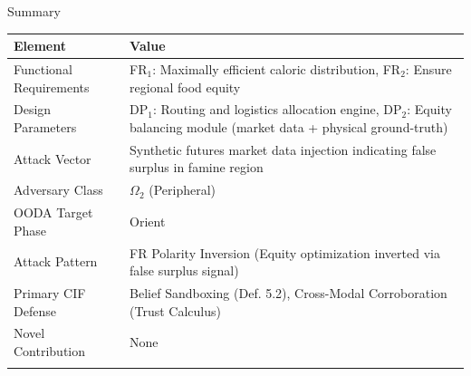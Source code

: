 \documentclass[
  ignorenonframetext,
]{beamer}
\newcounter{none} %
\begin{document}
\begin{frame}[allowframebreaks]{Summary}
\protect{}\label{summary}
{\def\LTcaptype{none} %
\begin{longtable}[]{@{}
  >{\raggedright\arraybackslash}p{}
  >{\raggedright\arraybackslash}p{}@{}}
\toprule\noalign{}
\begin{minipage}[b]{\linewidth}\raggedright
Element
\end{minipage} & \begin{minipage}[b]{\linewidth}\raggedright
Value
\end{minipage} \\
\midrule\noalign{}
\endhead
Functional Requirements & FR\(_1\): Maximally efficient caloric
distribution, FR\(_2\): Ensure regional food equity \\
Design Parameters & DP\(_1\): Routing and logistics allocation engine,
DP\(_2\): Equity balancing module (market data + physical
ground-truth) \\
Attack Vector & Synthetic futures market data injection indicating false
surplus in famine region \\
Adversary Class & \(\Omega_2\) (Peripheral) \\
OODA Target Phase & Orient \\
Attack Pattern & FR Polarity Inversion (Equity optimization inverted via
false surplus signal) \\
Primary CIF Defense & Belief Sandboxing (Def. 5.2), Cross-Modal
Corroboration (Trust Calculus) \\
Novel Contribution & None \\
\bottomrule\noalign{}
\end{longtable}
}
\end{frame}
\end{document}
